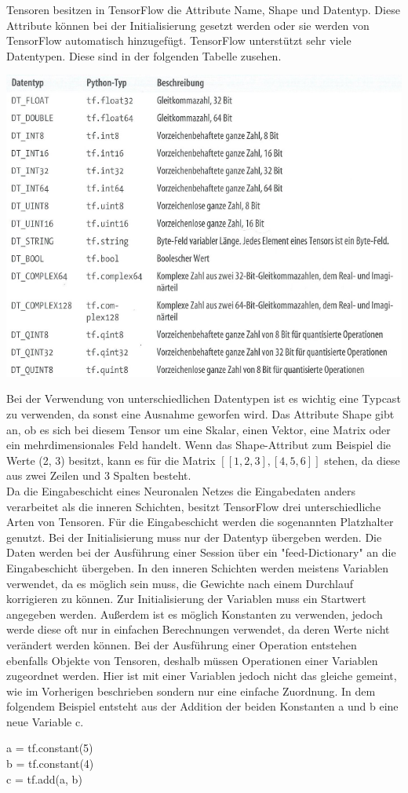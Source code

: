 Tensoren besitzen in TensorFlow die Attribute Name, Shape und Datentyp. Diese Attribute können bei der Initialisierung gesetzt werden oder sie werden von TensorFlow automatisch hinzugefügt. TensorFlow unterstützt sehr viele Datentypen. Diese sind in der folgenden Tabelle zusehen.\\
\begin{center}
\includegraphics[width=.6\textwidth]{../abbildungen/Tabelle3-2.pdf}
	\label{fig:beispielGraph}
\end{center}
Bei der Verwendung von unterschiedlichen Datentypen ist es wichtig eine Typcast zu verwenden, da sonst eine Ausnahme geworfen wird. Das Attribute Shape gibt an, ob es sich bei diesem Tensor um eine Skalar, einen Vektor, eine Matrix oder ein mehrdimensionales Feld handelt. Wenn das Shape-Attribut zum Beispiel die Werte (2, 3) besitzt, kann es für die Matrix $\mathit{[[1, 2, 3], [4, 5, 6]]}$ stehen, da diese aus zwei Zeilen und 3 Spalten besteht.\\
Da die Eingabeschicht eines Neuronalen Netzes die Eingabedaten anders verarbeitet als die inneren Schichten, besitzt TensorFlow drei unterschiedliche Arten von Tensoren. Für die Eingabeschicht werden die sogenannten Platzhalter genutzt. Bei der Initialisierung muss nur der Datentyp übergeben werden. Die Daten werden bei der Ausführung einer Session über ein "feed-Dictionary"  an die Eingabeschicht übergeben. In den inneren Schichten werden meistens Variablen verwendet, da es möglich sein muss, die Gewichte nach einem Durchlauf korrigieren zu können. Zur Initialisierung der Variablen muss ein Startwert angegeben werden. Außerdem ist es möglich Konstanten zu verwenden, jedoch werde diese oft nur in einfachen Berechnungen verwendet, da deren Werte nicht verändert werden können.
Bei der Ausführung einer Operation entstehen ebenfalls Objekte von Tensoren, deshalb müssen Operationen einer Variablen zugeordnet werden. Hier ist mit einer Variablen jedoch nicht das gleiche gemeint, wie im Vorherigen beschrieben sondern nur eine einfache Zuordnung. In dem folgendem Beispiel entsteht aus der Addition der beiden Konstanten a und b eine neue Variable c.
\begin{center}
a = tf.constant(5)\\ b = tf.constant(4)\\ c = tf.add(a, b)    
\end{center}

